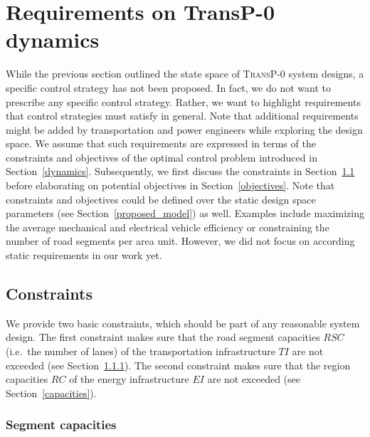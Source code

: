 \section{Requirements on \textbf{TransP-0} dynamics}
\label{requirements}

While the previous section outlined the state space of \textsc{TransP-0} system designs, a specific control strategy has not been proposed. In fact, we do not want to prescribe any specific control strategy. Rather, we want to highlight requirements that control strategies must satisfy in general. Note that additional requirements might be added by transportation and power engineers while exploring the design space. We assume that such requirements are expressed in terms of the constraints and objectives of the optimal control problem introduced in Section~\ref{dynamics}. Subsequently, we first discuss the constraints in Section~\ref{constraints} before elaborating on potential objectives in Section~\ref{objectives}. Note that constraints and objectives could be defined over the static design space parameters (see Section~\ref{proposed_model}) as well. Examples include maximizing the average mechanical and electrical vehicle efficiency or constraining the number of road segments per area unit. However, we did not focus on according static requirements in our work yet.

\subsection{Constraints}
\label{constraints}

We provide two basic constraints, which should be part of any reasonable system design. The first constraint makes sure that the road segment capacities $RSC$ (i.e.\ the number of lanes) of the transportation infrastructure $TI$ are not exceeded (see Section~\ref{collisions}). The second constraint makes sure that the region capacities $RC$ of the energy infrastructure $EI$ are not exceeded (see Section~\ref{capacities}).

\subsubsection{Segment capacities}
\label{collisions}

